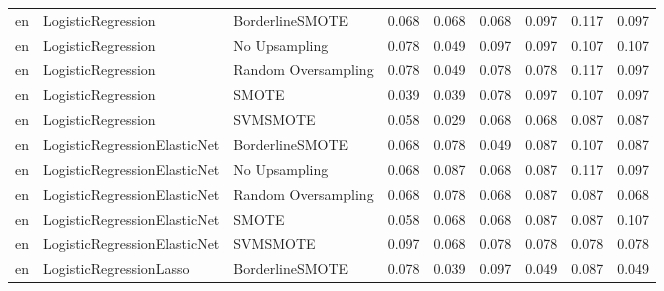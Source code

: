 \begin{tabular}{lllllllll}
      en &           LogisticRegression &     BorderlineSMOTE & 0.068 &                     0.068 &                 0.068 &                  0.097 &                                   0.117 &     0.097 \\
      en &           LogisticRegression &       No Upsampling & 0.078 &                     0.049 &                 0.097 &                  0.097 &                                   0.107 &     0.107 \\
      en &           LogisticRegression & Random Oversampling & 0.078 &                     0.049 &                 0.078 &                  0.078 &                                   0.117 &     0.097 \\
      en &           LogisticRegression &               SMOTE & 0.039 &                     0.039 &                 0.078 &                  0.097 &                                   0.107 &     0.097 \\
      en &           LogisticRegression &            SVMSMOTE & 0.058 &                     0.029 &                 0.068 &                  0.068 &                                   0.087 &     0.087 \\
      en & LogisticRegressionElasticNet &     BorderlineSMOTE & 0.068 &                     0.078 &                 0.049 &                  0.087 &                                   0.107 &     0.087 \\
      en & LogisticRegressionElasticNet &       No Upsampling & 0.068 &                     0.087 &                 0.068 &                  0.087 &                                   0.117 &     0.097 \\
      en & LogisticRegressionElasticNet & Random Oversampling & 0.068 &                     0.078 &                 0.068 &                  0.087 &                                   0.087 &     0.068 \\
      en & LogisticRegressionElasticNet &               SMOTE & 0.058 &                     0.068 &                 0.068 &                  0.087 &                                   0.087 &     0.107 \\
      en & LogisticRegressionElasticNet &            SVMSMOTE & 0.097 &                     0.068 &                 0.078 &                  0.078 &                                   0.078 &     0.078 \\
      en &      LogisticRegressionLasso &     BorderlineSMOTE & 0.078 &                     0.039 &                 0.097 &                  0.049 &                                   0.087 &     0.049 \\

\end{tabular}
